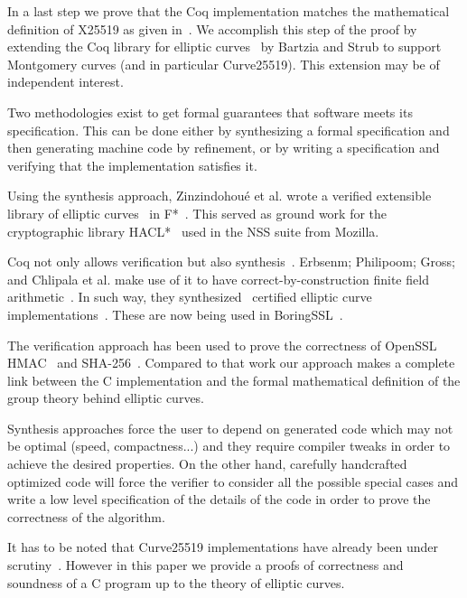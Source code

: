 In a last step we prove that the Coq implementation matches
the mathematical definition of X25519 as given in~\cite[Sec.~2]{Ber06}.
We accomplish this step of the proof by extending the Coq library
for elliptic curves~\cite{BartziaS14} by Bartzia and Strub to
support Montgomery curves (and in particular Curve25519).
This extension may be of independent interest.

Two methodologies exist to get formal guarantees that software meets its specification.
This can be done either by synthesizing a formal specification and then generating
machine code by refinement, or by writing a specification and verifying that the
implementation satisfies it.

Using the synthesis approach, Zinzindohou{\'{e}} et al. wrote a verified extensible
library of elliptic curves~\cite{Zinzindohoue2016AVE} in F*~\cite{DBLP:journals/corr/BhargavanDFHPRR17}.
This served as ground work for the cryptographic library HACL*~\cite{zinzindohoue2017hacl}
used in the NSS suite from Mozilla.

Coq not only allows verification but also synthesis~\cite{CpdtJFR}.
Erbsenm; Philipoom; Gross; and Chlipala et al. make use of it to have
correct-by-construction finite field arithmetic~\cite{Philipoom2018CorrectbyconstructionFF}.
In such way, they synthesized~\cite{Erbsen2016SystematicSO} certified elliptic curve
implementations~\cite{Erbsen2017CraftingCE}. These are now being used in
BoringSSL~\cite{fiat-crypto}.

The verification approach has been used to prove the correctness of OpenSSL
HMAC~\cite{Beringer2015VerifiedCA} and SHA-256~\cite{2015-Appel}. Compared to
that work our approach makes a complete link between the C implementation and
the formal mathematical definition of the group theory behind elliptic curves.

Synthesis approaches force the user to depend on generated code which may not
be optimal (speed, compactness...) and they require compiler tweaks in order
to achieve the desired properties. On the other hand, carefully handcrafted
optimized code will force the verifier to consider all the possible special cases
and write a low level specification of the details of the code in order to prove
the correctness of the algorithm.

It has to be noted that Curve25519 implementations have already been under scrutiny~\cite{Chen2014VerifyingCS}.
However in this paper we provide a proofs of correctness and soundness of a C program up to
the theory of elliptic curves.

